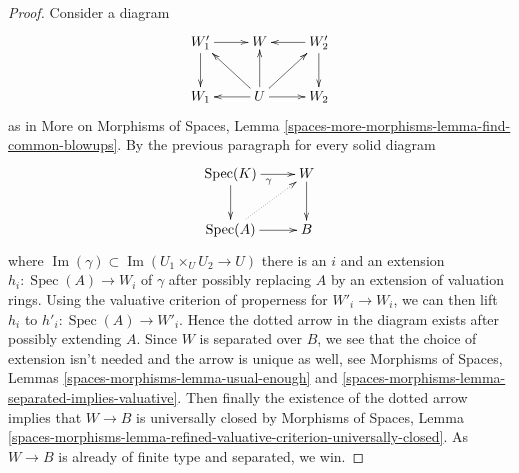 \documentclass[10pt,a4paper]{amsart}
\theoremstyle{plain}
\theoremstyle{definition}
\theoremstyle{remark}
\numberwithin{equation}{subsection}
\def\Spec{\mathop{\mathrm{Spec}}}
\def\Im{\mathop{\mathrm{Im}}}
\begin{document}
\begin{proof}
\medskip\noindent
Consider a diagram
$$
\xymatrix{
W_1' \ar[d] \ar[r] & W & W_2' \ar[l] \ar[d] \\
W_1 & U \ar[l] \ar[lu] \ar[u] \ar[ru] \ar[r] & W_2
}
$$
as in More on Morphisms of Spaces, Lemma
\ref{spaces-more-morphisms-lemma-find-common-blowups}.
By the previous paragraph for every solid diagram
$$
\xymatrix{
\Spec(K) \ar[r]_\gamma  \ar[d] & W \ar[d] \\
\Spec(A) \ar@{..>}[ru] \ar[r] & B
}
$$
where $\Im(\gamma) \subset \Im(U_1 \times_U U_2 \to U)$
there is an $i$ and an extension $h_i : \Spec(A) \to W_i$ of $\gamma$
after possibly replacing $A$ by an extension of valuation rings.
Using the valuative criterion of properness for $W'_i \to W_i$,
we can then lift $h_i$ to $h'_i : \Spec(A) \to W'_i$.
Hence the dotted arrow in the diagram exists after possibly
extending $A$. Since $W$ is separated over $B$, we see that the choice
of extension isn't needed and the arrow is unique as well, see
Morphisms of Spaces, Lemmas \ref{spaces-morphisms-lemma-usual-enough}
and \ref{spaces-morphisms-lemma-separated-implies-valuative}.
Then finally the existence of the dotted arrow
implies that $W \to B$ is universally closed by
Morphisms of Spaces, Lemma
\ref{spaces-morphisms-lemma-refined-valuative-criterion-universally-closed}.
As $W \to B$ is already of finite type and separated, we win.
\end{proof}



\end{document}
